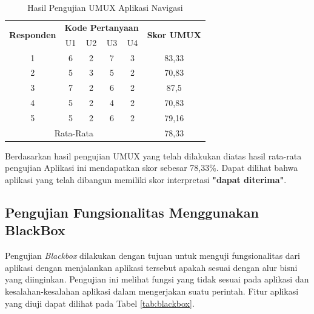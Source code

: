 \begin{table}[H]
\caption{Hasil Pengujian UMUX Aplikasi Navigasi}
\label{tab:skor-umux}
\begin{tabular}{|ccccc|c|}
\hline
\multicolumn{1}{|c|}{\multirow{2}{*}{\textbf{Responden}}} & \multicolumn{4}{c|}{\textbf{Kode Pertanyaan}} & \multirow{2}{*}{\textbf{Skor UMUX}} \\ \cline{2-5}
\multicolumn{1}{|c|}{}  & \multicolumn{1}{c|}{U1} & \multicolumn{1}{c|}{U2} & \multicolumn{1}{c|}{U3} & U4 &       \\ \hline
\multicolumn{1}{|c|}{1} & \multicolumn{1}{c|}{6}  & \multicolumn{1}{c|}{2}  & \multicolumn{1}{c|}{7}  & 3  & 83,33 \\ \hline
\multicolumn{1}{|c|}{2} & \multicolumn{1}{c|}{5}  & \multicolumn{1}{c|}{3}  & \multicolumn{1}{c|}{5}  & 2  & 70,83 \\ \hline
\multicolumn{1}{|c|}{3} & \multicolumn{1}{c|}{7}  & \multicolumn{1}{c|}{2}  & \multicolumn{1}{c|}{6}  & 2  & 87,5  \\ \hline
\multicolumn{1}{|c|}{4} & \multicolumn{1}{c|}{5}  & \multicolumn{1}{c|}{2}  & \multicolumn{1}{c|}{4}  & 2  & 70,83 \\ \hline
\multicolumn{1}{|c|}{5} & \multicolumn{1}{c|}{5}  & \multicolumn{1}{c|}{2}  & \multicolumn{1}{c|}{6}  & 2  & 79,16 \\ \hline
\multicolumn{5}{|c|}{Rata-Rata}                                                                            & 78,33       \\ \hline
\end{tabular}
\end{table}

\par Berdasarkan hasil pengujian UMUX yang telah dilakukan diatas hasil rata-rata pengujian Aplikasi ini mendapatkan skor sebesar 78,33\%. Dapat dilihat bahwa aplikasi yang telah dibangun memiliki skor interpretasi \textbf{"dapat diterima"}.

\subsection{Pengujian Fungsionalitas Menggunakan BlackBox}
\par Pengujian \textit{Blackbox} dilakukan dengan tujuan untuk menguji fungsionalitas dari aplikasi dengan menjalankan aplikasi tersebut apakah sesuai dengan alur bisni yang diinginkan.  Pengujian ini melihat fungsi yang tidak sesuai pada aplikasi dan
kesalahan-kesalahan aplikasi dalam mengerjakan suatu perintah. Fitur aplikasi yang diuji dapat dilihat pada Tabel \ref{tab:blackbox}.

